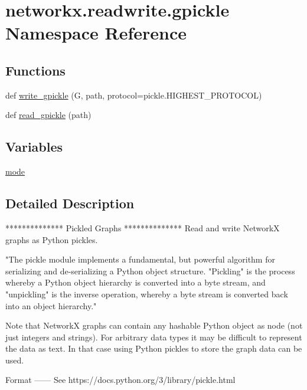 \hypertarget{namespacenetworkx_1_1readwrite_1_1gpickle}{}\section{networkx.\+readwrite.\+gpickle Namespace Reference}
\label{namespacenetworkx_1_1readwrite_1_1gpickle}
\subsection*{Functions}
\begin{DoxyCompactItemize}
\item 
def \hyperlink{namespacenetworkx_1_1readwrite_1_1gpickle_a58e61477e773f922a302f97374b2880e}{write\+\_\+gpickle} (G, path, protocol=pickle.\+H\+I\+G\+H\+E\+S\+T\+\_\+\+P\+R\+O\+T\+O\+C\+OL)
\item 
def \hyperlink{namespacenetworkx_1_1readwrite_1_1gpickle_a733db274ef3b0b0eb420eb3c5949cbee}{read\+\_\+gpickle} (path)
\end{DoxyCompactItemize}
\subsection*{Variables}
\begin{DoxyCompactItemize}
\item 
\hyperlink{namespacenetworkx_1_1readwrite_1_1gpickle_abd01337093697403592fcbf5de20d3e7}{mode}
\end{DoxyCompactItemize}


\subsection{Detailed Description}
\begin{DoxyVerb}**************
Pickled Graphs
**************
Read and write NetworkX graphs as Python pickles.

"The pickle module implements a fundamental, but powerful algorithm
for serializing and de-serializing a Python object
structure. "Pickling" is the process whereby a Python object hierarchy
is converted into a byte stream, and "unpickling" is the inverse
operation, whereby a byte stream is converted back into an object
hierarchy."

Note that NetworkX graphs can contain any hashable Python object as
node (not just integers and strings).  For arbitrary data types it may
be difficult to represent the data as text.  In that case using Python
pickles to store the graph data can be used.

Format
------
See https://docs.python.org/3/library/pickle.html
\end{DoxyVerb}
 

